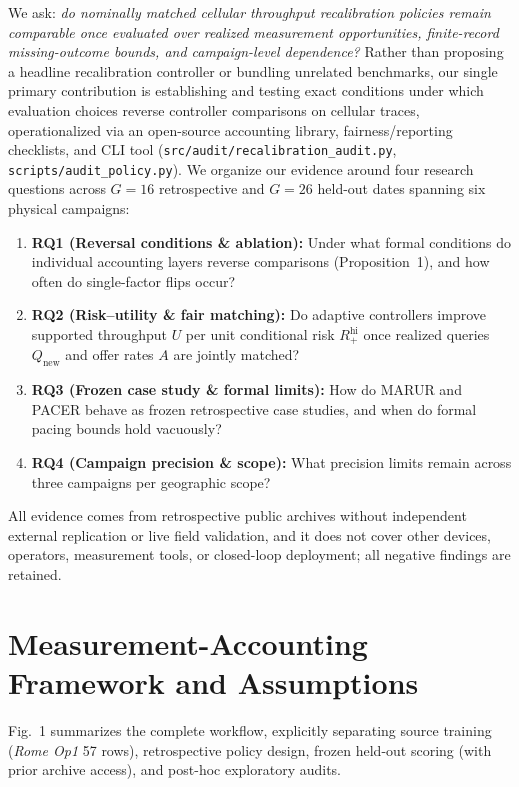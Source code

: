 \documentclass[journal,10pt]{IEEEtran}
\begin{document}
We ask: \emph{do nominally matched cellular throughput recalibration policies remain comparable once evaluated over realized measurement opportunities, finite-record missing-outcome bounds, and campaign-level dependence?} Rather than proposing a headline recalibration controller or bundling unrelated benchmarks, our single primary contribution is establishing and testing exact conditions under which evaluation choices reverse controller comparisons on cellular traces, operationalized via an open-source accounting library, fairness/reporting checklists, and CLI tool (\texttt{src/audit/\allowbreak recalibration\_audit.py}, \texttt{scripts/\allowbreak audit\_policy.py}). We organize our evidence around four research questions across $G=16$ retrospective and $G=26$ held-out dates spanning six physical campaigns:

\begin{enumerate}
\item \textbf{RQ1 (Reversal conditions \& ablation):} Under what formal conditions do individual accounting layers reverse comparisons (Proposition~1), and how often do single-factor flips occur?
\item \textbf{RQ2 (Risk--utility \& fair matching):} Do adaptive controllers improve supported throughput $U$ per unit conditional risk $R_+^{\text{hi}}$ once realized queries $Q_{\text{new}}$ and offer rates $A$ are jointly matched?
\item \textbf{RQ3 (Frozen case study \& formal limits):} How do MARUR and PACER behave as frozen retrospective case studies, and when do formal pacing bounds hold vacuously?
\item \textbf{RQ4 (Campaign precision \& scope):} What precision limits remain across three campaigns per geographic scope?
\end{enumerate}

All evidence comes from retrospective public archives without independent external replication or live field validation, and it does not cover other devices, operators, measurement tools, or closed-loop deployment; all negative findings are retained.



\section{Measurement-Accounting Framework and Assumptions}
\label{sec:framework}
Fig.~1 summarizes the complete workflow, explicitly separating source training (\emph{Rome Op1} 57 rows), retrospective policy design, frozen held-out scoring (with prior archive access), and post-hoc exploratory audits.
\end{document}
